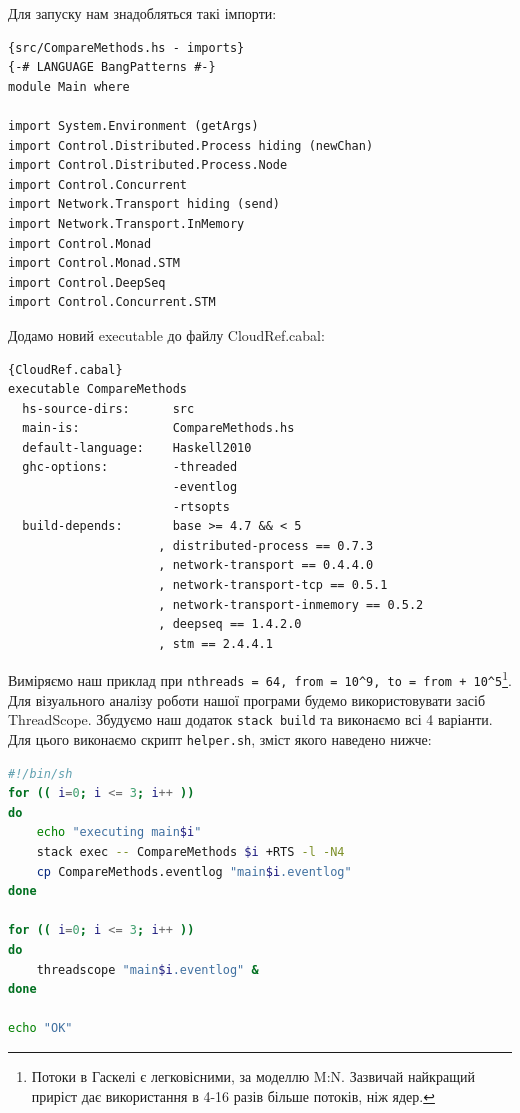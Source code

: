 \documentclass[12pt]{article}
\begin{document}
Для запуску нам знадобляться такі імпорти:

\begin{lstlisting}{src/CompareMethods.hs - imports}
{-# LANGUAGE BangPatterns #-}
module Main where

import System.Environment (getArgs)
import Control.Distributed.Process hiding (newChan)
import Control.Distributed.Process.Node 
import Control.Concurrent
import Network.Transport hiding (send)
import Network.Transport.InMemory
import Control.Monad
import Control.Monad.STM
import Control.DeepSeq
import Control.Concurrent.STM
\end{lstlisting}

Додамо новий executable до файлу CloudRef.cabal:

\begin{lstlisting}{CloudRef.cabal}
executable CompareMethods
  hs-source-dirs:      src
  main-is:             CompareMethods.hs
  default-language:    Haskell2010
  ghc-options:         -threaded
                       -eventlog
                       -rtsopts
  build-depends:       base >= 4.7 && < 5
                     , distributed-process == 0.7.3
                     , network-transport == 0.4.4.0
                     , network-transport-tcp == 0.5.1
                     , network-transport-inmemory == 0.5.2
                     , deepseq == 1.4.2.0
                     , stm == 2.4.4.1
\end{lstlisting}

Виміряємо наш приклад при \lstinline{nthreads = 64, from = 10^9, to = from + 10^5}\footnote{Потоки в Гаскелі є легковісними, за моделлю M:N. Зазвичай найкращий приріст дає використання в 4-16 разів більше потоків, ніж ядер.}. 
Для візуального аналізу роботи нашої програми будемо використовувати засіб ThreadScope. 
Збудуємо наш додаток \lstinline{stack build} та виконаємо всі 4 варіанти. Для цього 
виконаємо скрипт \lstinline{helper.sh}, зміст якого наведено нижче:

\begin{lstlisting}[language=bash, caption=helper.sh]
#!/bin/sh
for (( i=0; i <= 3; i++ ))
do
    echo "executing main$i"
    stack exec -- CompareMethods $i +RTS -l -N4
    cp CompareMethods.eventlog "main$i.eventlog"
done

for (( i=0; i <= 3; i++ ))
do
    threadscope "main$i.eventlog" &
done

echo "OK"
\end{lstlisting}
\end{document}
